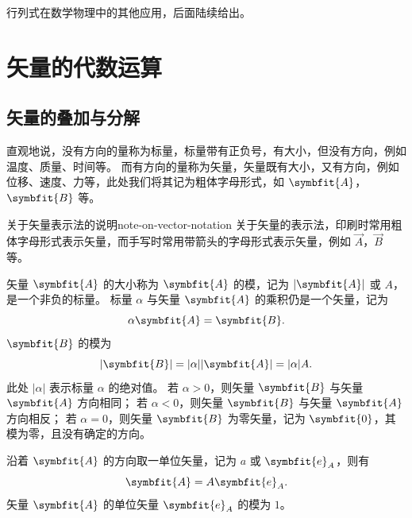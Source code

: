 \bigskip

行列式在数学物理中的其他应用，后面陆续给出。

\section{矢量的代数运算}\label{sec:algebraic-operations-of-vectors}

\subsection{矢量的叠加与分解}\label{subsec:addition-and-decomposition-of-vectors}

直观地说，没有方向的量称为标量，标量带有正负号，有大小，但没有方向，例如温度、质量、时间等。
而有方向的量称为矢量，矢量既有大小，又有方向，例如位移、速度、力等，此处我们将其记为粗体字母形式，如 $ \symbfit{A} $，$ \symbfit{B} $ 等。

\begin{note}{关于矢量表示法的说明}{note-on-vector-notation}
    关于矢量的表示法，印刷时常用粗体字母形式表示矢量，而手写时常用带箭头的字母形式表示矢量，例如 $ \vec{A} $，$ \vec{B} $ 等。
\end{note}

矢量 $ \symbfit{A} $ 的大小称为 $ \symbfit{A} $ 的模，记为 $ |\symbfit{A}| $ 或 $ A $，是一个非负的标量。
标量 $ \alpha $ 与矢量 $ \symbfit{A} $ 的乘积仍是一个矢量，记为
\begin{equation}
    \alpha \symbfit{A} = \symbfit{B} .
\end{equation}
$ \symbfit{B} $ 的模为
\begin{equation}
    |\symbfit{B}| = |\alpha| |\symbfit{A}| = |\alpha| A .
\end{equation}
此处 $ | \alpha| $ 表示标量 $ \alpha $ 的绝对值。
若 $ \alpha > 0 $，则矢量 $ \symbfit{B} $ 与矢量 $ \symbfit{A} $ 方向相同；
若 $ \alpha < 0 $，则矢量 $ \symbfit{B} $ 与矢量 $ \symbfit{A} $ 方向相反；
若 $ \alpha = 0 $，则矢量 $ \symbfit{B} $ 为零矢量，记为 $ \symbfit{0} $，其模为零，且没有确定的方向。

沿着 $ \symbfit{A} $ 的方向取一单位矢量，记为 $ a $ 或 $ \symbfit{e}_A $，则有
\begin{equation}
    \symbfit{A} = A \symbfit{e}_A .
\end{equation}
矢量 $ \symbfit{A} $ 的单位矢量 $ \symbfit{e}_A $ 的模为 $ 1 $。

\bigskip



